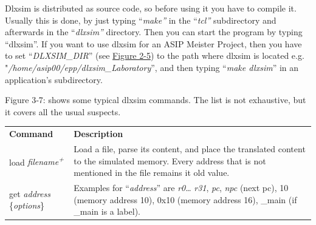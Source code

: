 \documentclass[
]{article}
\begin{document}
Dlxsim is distributed as source code, so before using it you have to
compile it. Usually this is done, by just typing ``\emph{make''} in the
``\emph{tcl''} subdirectory and afterwards in the ``\emph{dlxsim''}
directory. Then you can start the program by typing ``dlxsim''. If you
want to use dlxsim for an ASIP Meister Project, then you have to set
``\emph{DLXSIM\_DIR}'' (see \protect\hyperlink{Fig25}{Figure 2-5}) to
the path where dlxsim is located e.g.
"\emph{/home/asip00/epp/dlxsim\_Laboratory}'', and then typing
``\emph{make dlxsim}'' in an application's subdirectory.

Figure 3‑7: shows some typical dlxsim commands. The list is not
exhaustive, but it covers all the usual suspects.

\begin{longtable}[]{@{}ll@{}}
\toprule
\endhead
\textbf{Command} & \textbf{Description}\tabularnewline
load \emph{filename\textsuperscript{+}} & Load a file, parse its
content, and place the translated content to the simulated memory. Every
address that is not mentioned in the file remains it old
value.\tabularnewline
\begin{minipage}[t]{0.47\columnwidth}\raggedright
get \emph{address} \{\emph{options}\}\strut
\end{minipage} & \begin{minipage}[t]{0.47\columnwidth}\raggedright
Examples for ``\emph{address}'' are \emph{r0}\ldots{} \emph{r31},
\emph{pc}, \emph{npc} (next pc), 10 (memory address 10), 0x10 (memory
address 16), \_main (if \_main is a label).


\end{minipage}
\end{longtable}
\end{document}
